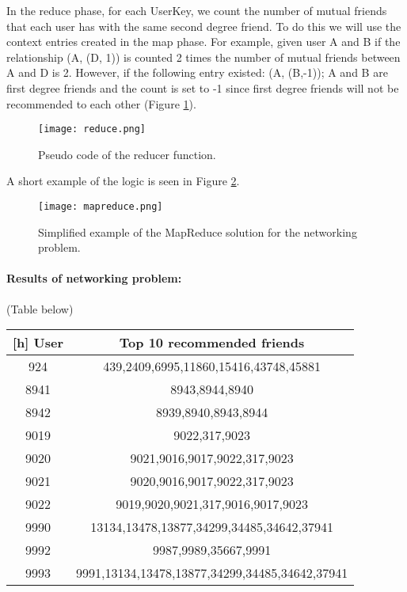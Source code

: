\documentclass[12pt]{article}
\begin{document}
In the reduce phase, for each UserKey, we count the number of mutual friends that each user has with the same second degree friend. To do this we will use the context entries created in the map phase. For example, given user A and B if the relationship (A, (D, 1)) is counted 2 times the number of mutual friends between A and D is 2. However, if the following entry existed: (A, (B,-1)); A and B are first degree friends and the count is set to -1 since first degree friends will not be recommended to each other (Figure \ref{fig:reduce}).

\begin{figure}[h]
  \centering
  \texttt{[image: reduce.png]}
  \caption{Pseudo code of the reducer function.}
  \label{fig:reduce}
\end{figure}

A short example of the logic is seen in Figure \ref{fig:mapreduce}.

\begin{figure}[h]
  \centering
  \texttt{[image: mapreduce.png]}
  \caption{Simplified example of the MapReduce solution for the networking problem.}
  \label{fig:mapreduce}
\end{figure}

\paragraph{Results of networking problem:} (Table below)

\begin{center}
\begin{tabular}{c|c}[h]
  User & Top 10 recommended friends\\
  \hline\hline
  924  &   439,2409,6995,11860,15416,43748,45881\\
  8941  &  8943,8944,8940\\
  8942   & 8939,8940,8943,8944\\
  9019  &  9022,317,9023\\
  9020   & 9021,9016,9017,9022,317,9023\\
  9021   & 9020,9016,9017,9022,317,9023\\
  9022   & 9019,9020,9021,317,9016,9017,9023\\
  9990   & 13134,13478,13877,34299,34485,34642,37941\\
  9992  &  9987,9989,35667,9991\\
  9993  &  9991,13134,13478,13877,34299,34485,34642,37941\\  
\end{tabular}
\end{center}
\end{document}
